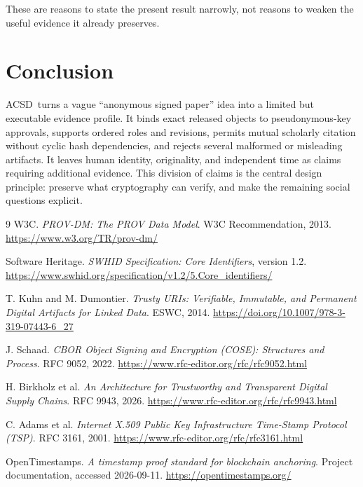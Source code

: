 \documentclass[11pt]{article}
\newcommand{\acsd}{\textsc{ACSD}}
\begin{document}
These are reasons to state the present result narrowly, not reasons to weaken the useful evidence it already preserves.

\section{Conclusion}

\acsd\ turns a vague ``anonymous signed paper'' idea into a limited but executable evidence profile. It binds exact released objects to pseudonymous-key approvals, supports ordered roles and revisions, permits mutual scholarly citation without cyclic hash dependencies, and rejects several malformed or misleading artifacts. It leaves human identity, originality, and independent time as claims requiring additional evidence. This division of claims is the central design principle: preserve what cryptography can verify, and make the remaining social questions explicit.

\begin{thebibliography}{9}
W3C. \emph{PROV-DM: The PROV Data Model}. W3C Recommendation, 2013. \url{https://www.w3.org/TR/prov-dm/}

Software Heritage. \emph{SWHID Specification: Core Identifiers}, version 1.2. \url{https://www.swhid.org/specification/v1.2/5.Core_identifiers/}

T. Kuhn and M. Dumontier. \emph{Trusty URIs: Verifiable, Immutable, and Permanent Digital Artifacts for Linked Data}. ESWC, 2014. \url{https://doi.org/10.1007/978-3-319-07443-6_27}

J. Schaad. \emph{CBOR Object Signing and Encryption (COSE): Structures and Process}. RFC 9052, 2022. \url{https://www.rfc-editor.org/rfc/rfc9052.html}

H. Birkholz et al. \emph{An Architecture for Trustworthy and Transparent Digital Supply Chains}. RFC 9943, 2026. \url{https://www.rfc-editor.org/rfc/rfc9943.html}

C. Adams et al. \emph{Internet X.509 Public Key Infrastructure Time-Stamp Protocol (TSP)}. RFC 3161, 2001. \url{https://www.rfc-editor.org/rfc/rfc3161.html}

OpenTimestamps. \emph{A timestamp proof standard for blockchain anchoring}.
Project documentation, accessed 2026-09-11. \url{https://opentimestamps.org/}
\end{thebibliography}
\end{document}
